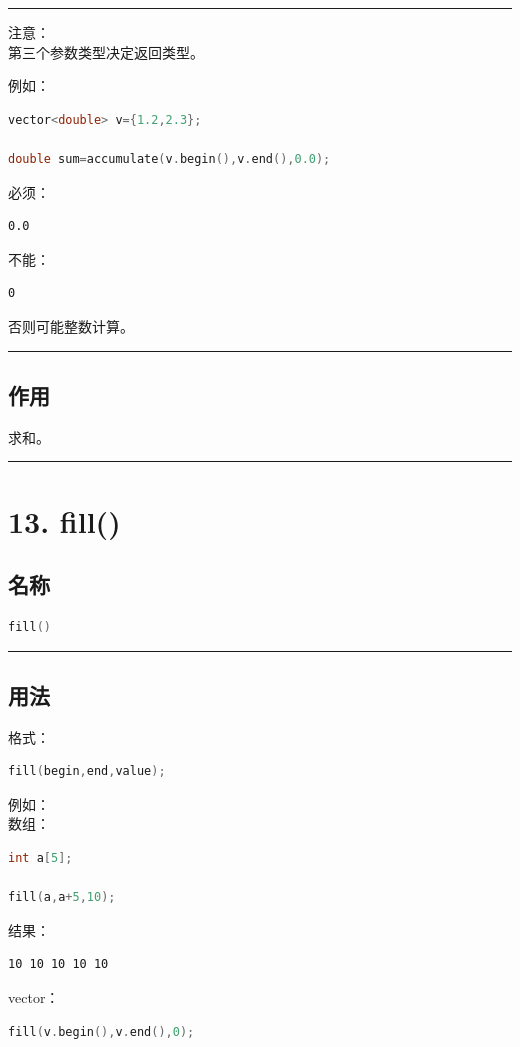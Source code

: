 \documentclass[10pt,twocolumn]{extarticle}
\begin{document}
\noindent\rule{\linewidth}{0.4pt}

注意：\\
第三个参数类型决定返回类型。

例如：
\begin{lstlisting}[language=C++]
vector<double> v={1.2,2.3};

double sum=accumulate(v.begin(),v.end(),0.0);
\end{lstlisting}
必须：
\begin{lstlisting}
0.0
\end{lstlisting}
不能：
\begin{lstlisting}
0
\end{lstlisting}
否则可能整数计算。

\noindent\rule{\linewidth}{0.4pt}

\subsection{作用}
求和。

\noindent\rule{\linewidth}{0.4pt}

\section{13. fill()}

\subsection{名称}
\begin{lstlisting}[language=C++]
fill()
\end{lstlisting}

\noindent\rule{\linewidth}{0.4pt}

\subsection{用法}
格式：
\begin{lstlisting}[language=C++]
fill(begin,end,value);
\end{lstlisting}
例如：\\
数组：
\begin{lstlisting}[language=C++]
int a[5];

fill(a,a+5,10);
\end{lstlisting}
结果：
\begin{lstlisting}
10 10 10 10 10
\end{lstlisting}
vector：
\begin{lstlisting}[language=C++]
fill(v.begin(),v.end(),0);
\end{lstlisting}
\end{document}
